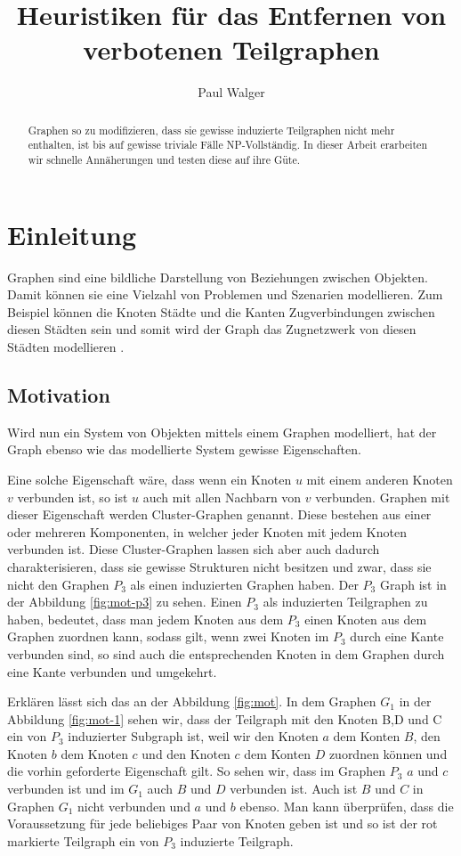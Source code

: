 \documentclass[12pt,a4paper,onecolumn,oneside,titlepage]{article}
\author{Paul Walger}
\title{Heuristiken für das Entfernen von verbotenen Teilgraphen}
\begin{document}
\maketitle
\tableofcontents
\newpage
\begin{abstract}
Graphen so zu modifizieren, dass sie gewisse induzierte Teilgraphen nicht mehr enthalten, ist bis auf gewisse triviale Fälle NP-Vollständig.
 In dieser Arbeit erarbeiten wir schnelle Annäherungen und testen diese auf ihre Güte.
  
\end{abstract}
  
\section{Einleitung}

Graphen sind eine bildliche Darstellung von Beziehungen zwischen Objekten. Damit können sie eine Vielzahl von Problemen und Szenarien modellieren. Zum Beispiel können die Knoten Städte und die Kanten Zugverbindungen zwischen diesen Städten sein und somit wird der Graph das Zugnetzwerk von diesen Städten modellieren \cite{Nastos06}. 

\subsection{Motivation}
\label{sec:mot}
Wird nun ein System von Objekten mittels einem Graphen modelliert, hat der Graph ebenso wie das modellierte System gewisse Eigenschaften.

Eine solche Eigenschaft wäre, dass wenn ein Knoten $u$ mit einem anderen Knoten $v$ verbunden ist, so ist $u$ auch mit allen Nachbarn von $v$ verbunden. Graphen mit dieser Eigenschaft werden Cluster-Graphen  genannt. Diese bestehen aus einer oder mehreren Komponenten, in welcher jeder Knoten mit jedem Knoten verbunden ist.
Diese Cluster-Graphen lassen sich aber auch dadurch charakterisieren, dass sie gewisse Strukturen nicht besitzen und zwar, dass sie nicht den Graphen $P_3$ als einen induzierten Graphen haben. Der $P_3$ Graph ist in der Abbildung \ref{fig:mot-p3} zu sehen.
Einen $P_3$ als induzierten Teilgraphen zu haben, bedeutet, dass man jedem Knoten aus dem $P_3$ einen Knoten aus dem Graphen zuordnen kann, sodass gilt, wenn zwei Knoten im $P_3$ durch eine Kante verbunden sind, so sind auch die entsprechenden Knoten in dem Graphen durch eine Kante verbunden und umgekehrt.
 
Erklären lässt sich das an der Abbildung \ref{fig:mot}.
In dem Graphen $G_1$ in der Abbildung \ref{fig:mot-1} sehen wir, dass der Teilgraph mit den Knoten B,D und C ein von $P_3$ induzierter Subgraph ist, weil wir den Knoten $a$ dem Konten $B$, den Knoten $b$ dem Knoten $c$ und den Knoten $c$ dem Konten $D$ zuordnen können und die vorhin geforderte Eigenschaft gilt.
So sehen wir, dass im Graphen $P_3$ $a$ und $c$ verbunden ist und im  
$G_1$ auch $B$ und $D$ verbunden ist. Auch ist $B$ und $C$ in Graphen $G_1$ nicht verbunden und $a$ und $b$ ebenso.  Man kann überprüfen, dass die Voraussetzung für jede beliebiges Paar von Knoten geben ist und so ist der rot markierte Teilgraph ein von $P_3$ induzierte Teilgraph. 
\end{document}
